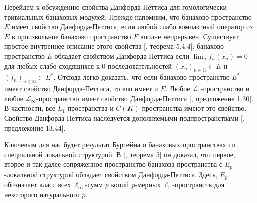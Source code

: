 \documentclass[12pt]{article}
\begin{document}
Перейдем к обсуждению свойства Данфорда-Петтиса для гомологически тривиальных
банаховых модулей. Прежде напомним, что банахово пространство $E$ имеет свойство
Данфорда-Петтиса, если любой слабо компактный оператор из $E$ в произвольное
банахово пространство $F$ вполне непрерывен. Существует простое внутреннее
описание этого свойства [\cite{KalAlbTopicsBanSpTh}, теорема 5.4.4]: банахово
пространство $E$ обладает свойством Данфорда-Петтиса если $\lim_n f_n(x_n)=0$
для любых слабо сходящихся к $0$ последовательностей
${(x_n)}_{n\in\mathbb{N}}\subset E$ и ${(f_n)}_{n\in\mathbb{N}}\subset E^*$.
Отсюда легко доказать, что если банахово пространство $E^*$ имеет свойство
Данфорда-Петтиса, то его имеет и $E$. Любое $\mathscr{L}_1$-пространство и любое
$\mathscr{L}_\infty$-пространство имеет свойство Данфорда-Петтиса
[\cite{BourgNewClOfLpSp}, предложение 1.30]. В частности, все $L_1$-пространства
и $C(K)$-пространства имеют это свойство. Свойство Данфорда-Петтиса наследуется
дополняемыми подпространствами [\cite{FabHabBanSpTh}, предложение 13.44].

Ключевым для нас будет результат Бургейна о банаховых пространствах со
специальной локальной структурой. В [\cite{BourgOnTheDPP}, теорема 5] он
доказал, что первое, второе и так далее сопряженное пространство банахова
пространства с $E_p$-локальной структурой обладает свойством Данфорда-Петтиса.
Здесь, $E_p$ обозначает класс всех $\ell_\infty$-сумм $p$ копий $p$-мерных
$\ell_1$-пространств для некоторого натурального $p$.
\end{document}
